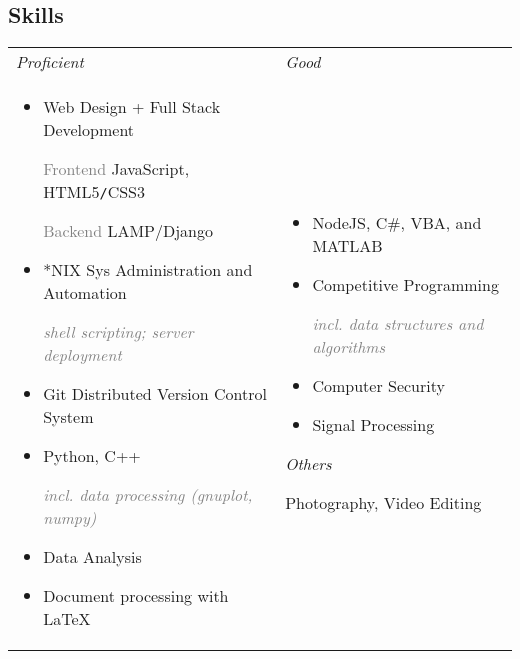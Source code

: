 	\subsection*{Skills}
	\vspace{-\parskip}
		{
			\renewcommand{\arraystretch}{1.5}
			\setlength{\tabcolsep}{12pt}
			\begin{tabularx}{\textwidth}{@{} p{} p{} @{}}
				\textcolor{skiheader}{\textit{Proficient}} & \textcolor{skiheader}{\textit{Good}} \\
				\vspace{-1em}
				\begin{itemize}[leftmargin=3mm]
					\renewcommand\labelitemi{}
					\setlength\itemsep{0.8em}
					\item Web Design + Full Stack Development \par
						\vspace{1mm}
						\hspace{1em} \textcolor{gray}{Frontend} \hfill JavaScript, HTML\textcolor{Bittersweet}{5}\texttt{/}CSS\textcolor{Bittersweet}{3} \par
						\hspace{1em} \textcolor{gray}{Backend} \hfill LAMP/Django 
					\item \**NIX Sys Administration and Automation \par
						\hfill \textcolor{gray}{\footnotesize \itshape shell scripting; server deployment}
					\item Git Distributed Version Control System
					\item Python, C++ \par %
						\hfill \textcolor{gray}{\footnotesize \itshape incl. data processing (gnuplot, numpy)}
					\item Data Analysis
					\item Document processing with{\fontfamily{cmr} \selectfont \LaTeX}
				\end{itemize} & 
				\vspace{-1em}
				\begin{itemize}[leftmargin=3mm]
					\renewcommand\labelitemi{}
					\setlength\itemsep{0.9em}
					\item NodeJS, C\#, VBA, and MATLAB 
					\item Competitive Programming \par
						\hfill \textcolor{gray}{\footnotesize \itshape incl. data structures and algorithms}
					\item Computer Security
					\item Signal Processing
				\end{itemize}
				\vspace{1cm}
				\textcolor{skiheader}{\textit{Others}} \par
				\vspace{1mm}
				\hspace{2mm} Photography, Video Editing 
			\end{tabularx}
		}
